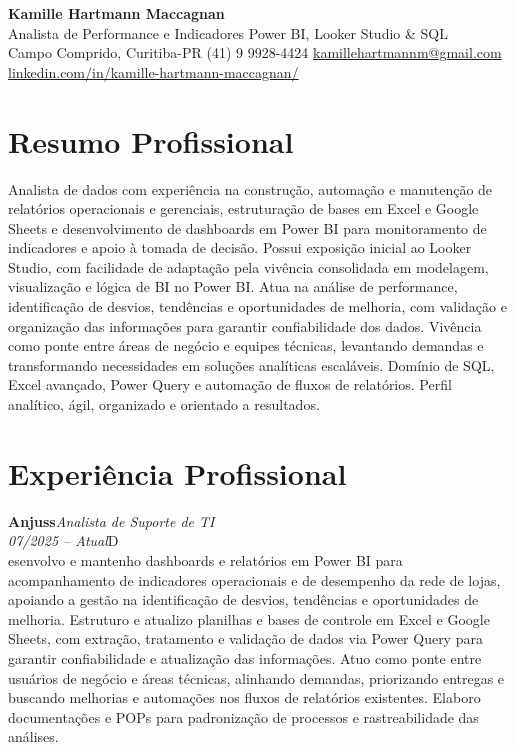 \documentclass[11pt,a4paper]{article}
\newcommand{\cvrole}[4]{%
  \vspace{4pt}%
  {\bfseries\color{accentcolor}#1}\hfill{\itshape #2}\\[-2pt]%
  {\itshape #3}\hfill #4\\[6pt]%
}
\begin{document}
\begin{center}
  {\fontsize{20}{24}\selectfont\bfseries Kamille Hartmann Maccagnan}\\[8pt]
  {\large Analista de Performance e Indicadores \textbar{} Power BI, Looker Studio \& SQL}\\[10pt]
  Campo Comprido, Curitiba-PR \enspace\textbullet\enspace (41) 9 9928-4424 \enspace\textbullet\enspace
  \href{mailto:kamillehartmannm@gmail.com}{kamillehartmannm@gmail.com}\\[3pt]
  \href{https://linkedin.com/in/kamille-hartmann-maccagnan/}{linkedin.com/in/kamille-hartmann-maccagnan/}
\end{center}

\vspace{6pt}

\section{Resumo Profissional}

Analista de dados com experiência na construção, automação e manutenção de relatórios operacionais e gerenciais, estruturação de bases em Excel e Google Sheets e desenvolvimento de dashboards em Power BI para monitoramento de indicadores e apoio à tomada de decisão. Possui exposição inicial ao Looker Studio, com facilidade de adaptação pela vivência consolidada em modelagem, visualização e lógica de BI no Power BI. Atua na análise de performance, identificação de desvios, tendências e oportunidades de melhoria, com validação e organização das informações para garantir confiabilidade dos dados. Vivência como ponte entre áreas de negócio e equipes técnicas, levantando demandas e transformando necessidades em soluções analíticas escaláveis. Domínio de SQL, Excel avançado, Power Query e automação de fluxos de relatórios. Perfil analítico, ágil, organizado e orientado a resultados.

\section{Experiência Profissional}

\cvrole{Anjuss}{Analista de Suporte de TI}{07/2025 -- Atual}

Desenvolvo e mantenho dashboards e relatórios em Power BI para acompanhamento de indicadores operacionais e de desempenho da rede de lojas, apoiando a gestão na identificação de desvios, tendências e oportunidades de melhoria. Estruturo e atualizo planilhas e bases de controle em Excel e Google Sheets, com extração, tratamento e validação de dados via Power Query para garantir confiabilidade e atualização das informações. Atuo como ponte entre usuários de negócio e áreas técnicas, alinhando demandas, priorizando entregas e buscando melhorias e automações nos fluxos de relatórios existentes. Elaboro documentações e POPs para padronização de processos e rastreabilidade das análises.
\end{document}

